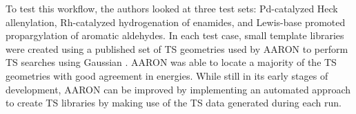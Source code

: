 \documentclass[preprint, 11pt]{elsarticle} %
\begin{document}

To test this workflow, the authors looked at three test sets: Pd-catalyzed Heck allenylation, Rh-catalyzed hydrogenation of enamides, and Lewis-base promoted propargylation of aromatic aldehydes.
In each test case, small template libraries were created using a published set of TS geometries used by AARON to perform TS searches using Gaussian \cite{Gaussian:2009}.
AARON was able to locate a majority of the TS geometries with good agreement in energies.
While still in its early stages of development, AARON can be improved by implementing an automated approach to create TS libraries by making use of the TS data generated during each run.


\end{document}
